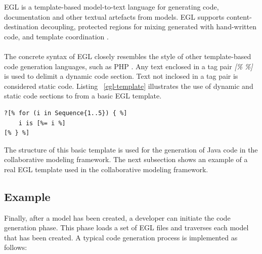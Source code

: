 EGL is a template-based model-to-text language for generating code, documentation and other textual artefacts from models. EGL supports content-destination decoupling, protected regions for mixing generated with hand-written code, and template coordination \cite{EpsilonGenerationLanguage}. \\ \\
The concrete syntax of EGL closely resembles the style of other template-based code generation languages, such as PHP \cite{EpsilonBook}. Any text enclosed in a tag pair \textit{[\%} \textit{\%]} is used to delimit a dynamic code section. Text not inclosed in a tag pair is considered static code. Listing ~\ref{egl-template} illustrates the use of dynamic and static code sections to from a basic EGL template. 
\begin{lstlisting}[label=egl-template,caption=EGL template, captionpos=t]
?[% for (i in Sequence{1..5}) { %]
	i is [%= i %]
[% } %]
\end{lstlisting}
The structure of this basic template is used for the generation of Java code in the collaborative modeling framework. The next subsection shows an example of a real EGL template used in the collaborative modeling framework.

\subsection{Example}

Finally, after a model has been created, a developer can initiate the code generation phase. This phase loads a set of EGL files and traverses each model that has been created. A typical code generation process is implemented as follows:

